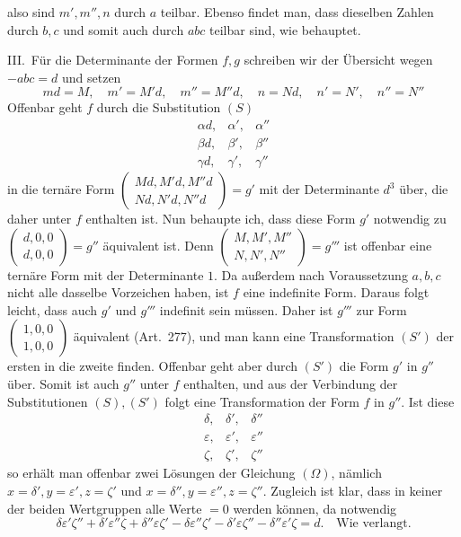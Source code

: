 also sind \(m',m'',n\) durch \(a\) teilbar. Ebenso findet man,
dass dieselben Zahlen durch \(b,c\) und somit auch durch
\(abc\) teilbar sind, wie behauptet.
\par
III.\ Für die Determinante der Formen \(f,g\) schreiben wir
der Übersicht wegen \(-abc=d\) und setzen
\[
md=M,\quad m'=M'd,\quad m''=M''d,\quad n=Nd,\quad n'=N',\quad n''=N''
\]
Offenbar geht \(f\) durch die Substitution \((S)\)
\[
\begin{array}{ccc}
\alpha d,&\alpha',&\alpha''\\
\beta d,&\beta',&\beta''\\
\gamma d,&\gamma',&\gamma''
\end{array}
\]
in die ternäre Form \(\left(\begin{smallmatrix}Md,M'd,M''d\\Nd,N'd,N''d\end{smallmatrix}\right)=g'\) mit der Determinante \(d^3\)
über, die daher unter \(f\) enthalten ist. Nun behaupte ich,
dass diese Form \(g'\) notwendig zu \(\left(\begin{smallmatrix}d,0,0\\d,0,0\end{smallmatrix}\right)=g''\) äquivalent ist.
Denn \(\left(\begin{smallmatrix}M,M',M''\\N,N',N''\end{smallmatrix}\right)=g'''\) ist offenbar eine ternäre Form mit der Determinante
\(1\). Da außerdem nach Voraussetzung \(a,b,c\) nicht alle
dasselbe Vorzeichen haben, ist \(f\) eine indefinite Form.
Daraus folgt leicht, dass auch \(g'\) und \(g'''\) indefinit
sein müssen. Daher ist \(g'''\) zur Form \(\left(\begin{smallmatrix}1,0,0\\1,0,0\end{smallmatrix}\right)\) äquivalent
(Art.\ 277), und man kann eine Transformation \((S')\) der
ersten in die zweite finden. Offenbar geht aber durch \((S')\)
die Form \(g'\) in \(g''\) über. Somit ist auch \(g''\)
unter \(f\) enthalten, und aus der Verbindung der Substitutionen
\((S),(S')\) folgt eine Transformation der Form \(f\) in \(g''\).
Ist diese
\[
\begin{array}{ccc}
\delta,&\delta',&\delta''\\
\varepsilon,&\varepsilon',&\varepsilon''\\
\zeta,&\zeta',&\zeta''
\end{array}
\]
so erhält man offenbar zwei Lösungen der Gleichung \((\Omega)\),
nämlich \(x=\delta',y=\varepsilon',z=\zeta'\) und \(x=\delta'',y=\varepsilon'',z=\zeta''\). Zugleich ist klar, dass in keiner
der beiden Wertgruppen alle Werte \(=0\) werden können, da
notwendig
\[
\delta\varepsilon'\zeta''+\delta'\varepsilon''\zeta+\delta''\varepsilon\zeta'-\delta\varepsilon''\zeta'-\delta'\varepsilon\zeta''-\delta''\varepsilon'\zeta=d.\quad\text{Wie verlangt.}
\]

